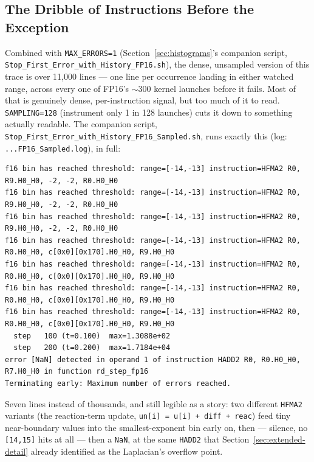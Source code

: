 \documentclass[11pt]{article}
\begin{document}
\subsection{The Dribble of Instructions Before the Exception}
\label{sec:dribble}

Combined with \texttt{MAX\_ERRORS=1} (Section~\ref{sec:histograms}'s companion script,
\texttt{Stop\_First\_Error\_with\_History\_FP16.sh}), the dense, unsampled version of this
trace is over 11{,}000 lines --- one line per occurrence landing in either watched range,
across every one of FP16's $\sim\!300$ kernel launches before it fails. Most of that is
genuinely dense, per-instruction signal, but too much of it to read.
\texttt{SAMPLING=128} (instrument only 1 in 128 launches) cuts it down to something
actually readable. The companion script,
\texttt{Stop\_First\_Error\_\allowbreak with\_History\_\allowbreak FP16\_Sampled.sh},
runs exactly this (log: \texttt{...FP16\_Sampled.log}), in full:
\begin{lstlisting}[basicstyle=\ttfamily\scriptsize]
f16 bin has reached threshold: range=[-14,-13] instruction=HFMA2 R0, R9.H0_H0, -2, -2, R0.H0_H0
f16 bin has reached threshold: range=[-14,-13] instruction=HFMA2 R0, R9.H0_H0, -2, -2, R0.H0_H0
f16 bin has reached threshold: range=[-14,-13] instruction=HFMA2 R0, R9.H0_H0, -2, -2, R0.H0_H0
f16 bin has reached threshold: range=[-14,-13] instruction=HFMA2 R0, R0.H0_H0, c[0x0][0x170].H0_H0, R9.H0_H0
f16 bin has reached threshold: range=[-14,-13] instruction=HFMA2 R0, R0.H0_H0, c[0x0][0x170].H0_H0, R9.H0_H0
f16 bin has reached threshold: range=[-14,-13] instruction=HFMA2 R0, R0.H0_H0, c[0x0][0x170].H0_H0, R9.H0_H0
f16 bin has reached threshold: range=[-14,-13] instruction=HFMA2 R0, R0.H0_H0, c[0x0][0x170].H0_H0, R9.H0_H0
  step   100 (t=0.100)  max=1.3088e+02
  step   200 (t=0.200)  max=1.7184e+04
error [NaN] detected in operand 1 of instruction HADD2 R0, R0.H0_H0, R7.H0_H0 in function rd_step_fp16
Terminating early: Maximum number of errors reached.
\end{lstlisting}
Seven lines instead of thousands, and still legible as a story: two different
\texttt{HFMA2} variants (the reaction-term update, \texttt{un[i] = u[i] + diff + reac})
feed tiny near-boundary values into the smallest-exponent bin early on, then --- silence,
no \texttt{[14,15]} hits at all --- then a \texttt{NaN}, at the same \texttt{HADD2} that
Section~\ref{sec:extended-detail} already identified as the Laplacian's overflow point.
\end{document}
